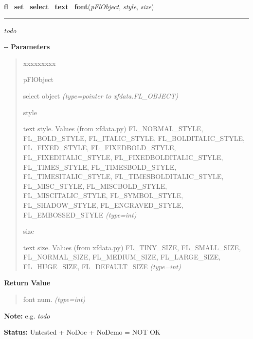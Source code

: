 \hspace{.8\funcindent}\begin{boxedminipage}{\funcwidth}

    \raggedright \textbf{fl\_set\_select\_text\_font}(\textit{pFlObject}, \textit{style}, \textit{size})

    \vspace{-1.5ex}

    \rule{\textwidth}{0.5\fboxrule}
\setlength{\parskip}{2ex}

\emph{todo}

-{}-
\setlength{\parskip}{1ex}
      \textbf{Parameters}
      \vspace{-1ex}

      \begin{quote}
        \begin{Ventry}{xxxxxxxxx}

          \item[pFlObject]


select object
            {\it (type=pointer to xfdata.FL\_OBJECT)}

          \item[style]


text style. Values (from xfdata.py) FL\_NORMAL\_STYLE,
FL\_BOLD\_STYLE, FL\_ITALIC\_STYLE, FL\_BOLDITALIC\_STYLE, FL\_FIXED\_STYLE,
FL\_FIXEDBOLD\_STYLE, FL\_FIXEDITALIC\_STYLE, FL\_FIXEDBOLDITALIC\_STYLE,
FL\_TIMES\_STYLE, FL\_TIMESBOLD\_STYLE, FL\_TIMESITALIC\_STYLE,
FL\_TIMESBOLDITALIC\_STYLE, FL\_MISC\_STYLE, FL\_MISCBOLD\_STYLE,
FL\_MISCITALIC\_STYLE, FL\_SYMBOL\_STYLE, FL\_SHADOW\_STYLE,
FL\_ENGRAVED\_STYLE, FL\_EMBOSSED\_STYLE
            {\it (type=int)}

          \item[size]


text size. Values (from xfdata.py) FL\_TINY\_SIZE, FL\_SMALL\_SIZE,
FL\_NORMAL\_SIZE, FL\_MEDIUM\_SIZE, FL\_LARGE\_SIZE, FL\_HUGE\_SIZE,
FL\_DEFAULT\_SIZE
            {\it (type=int)}

        \end{Ventry}

      \end{quote}

      \textbf{Return Value}
    \vspace{-1ex}

      \begin{quote}

font num.
      {\it (type=int)}

      \end{quote}

\textbf{Note:} 
e.g. \emph{todo}


\textbf{Status:} 
Untested + NoDoc + NoDemo = NOT OK


    \end{boxedminipage}

